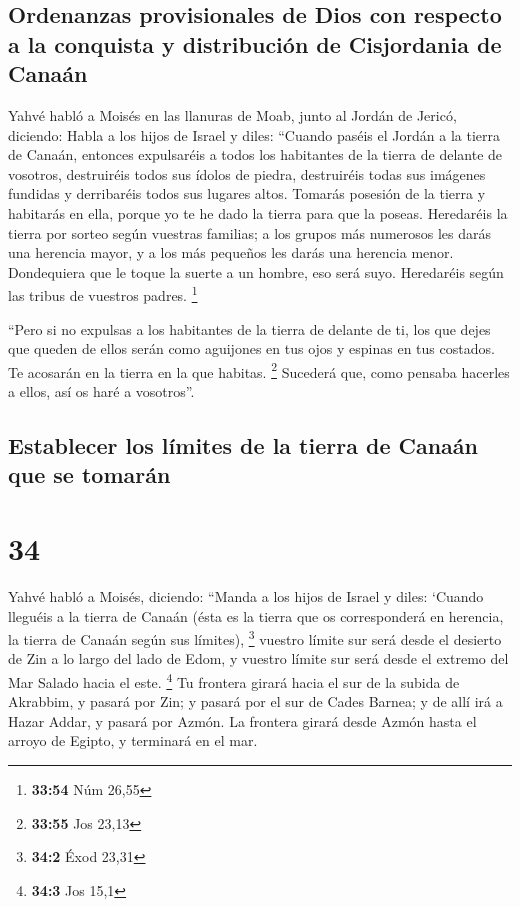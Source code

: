 \hypertarget{ordenanzas-provisionales-de-dios-con-respecto-a-la-conquista-y-distribuciuxf3n-de-cisjordania-de-canauxe1n}{%
\subsection{Ordenanzas provisionales de Dios con respecto a la conquista
y distribución de Cisjordania de
Canaán}\label{ordenanzas-provisionales-de-dios-con-respecto-a-la-conquista-y-distribuciuxf3n-de-cisjordania-de-canauxe1n}}

 Yahvé habló a Moisés en las llanuras de Moab, junto al
Jordán de Jericó, diciendo:  Habla a los hijos de Israel
y diles: ``Cuando paséis el Jordán a la tierra de Canaán,
 entonces expulsaréis a todos los habitantes de la tierra
de delante de vosotros, destruiréis todos sus ídolos de piedra,
destruiréis todas sus imágenes fundidas y derribaréis todos sus lugares
altos.  Tomarás posesión de la tierra y habitarás en
ella, porque yo te he dado la tierra para que la poseas. 
Heredaréis la tierra por sorteo según vuestras familias; a los grupos
más numerosos les darás una herencia mayor, y a los más pequeños les
darás una herencia menor. Dondequiera que le toque la suerte a un
hombre, eso será suyo. Heredaréis según las tribus de vuestros padres.
\footnote{\textbf{33:54} Núm 26,55}

 ``Pero si no expulsas a los habitantes de la tierra de
delante de ti, los que dejes que queden de ellos serán como aguijones en
tus ojos y espinas en tus costados. Te acosarán en la tierra en la que
habitas. \footnote{\textbf{33:55} Jos 23,13}  Sucederá
que, como pensaba hacerles a ellos, así os haré a vosotros''.

\hypertarget{establecer-los-luxedmites-de-la-tierra-de-canauxe1n-que-se-tomaruxe1n}{%
\subsection{Establecer los límites de la tierra de Canaán que se
tomarán}\label{establecer-los-luxedmites-de-la-tierra-de-canauxe1n-que-se-tomaruxe1n}}

\hypertarget{section-33}{%
\section{34}\label{section-33}}

 Yahvé habló a Moisés, diciendo:  ``Manda a
los hijos de Israel y diles: `Cuando lleguéis a la tierra de Canaán
(ésta es la tierra que os corresponderá en herencia, la tierra de Canaán
según sus límites), \footnote{\textbf{34:2} Éxod 23,31} 
vuestro límite sur será desde el desierto de Zin a lo largo del lado de
Edom, y vuestro límite sur será desde el extremo del Mar Salado hacia el
este. \footnote{\textbf{34:3} Jos 15,1}  Tu frontera
girará hacia el sur de la subida de Akrabbim, y pasará por Zin; y pasará
por el sur de Cades Barnea; y de allí irá a Hazar Addar, y pasará por
Azmón.  La frontera girará desde Azmón hasta el arroyo de
Egipto, y terminará en el mar.

